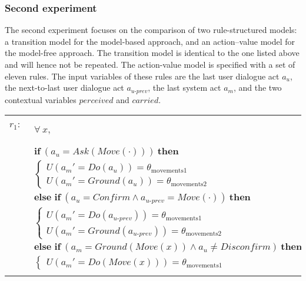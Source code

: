 \subsubsection*{Second experiment}

The second experiment focuses on the comparison of two rule-structured models: a transition model for the model-based approach, and an action--value model for the model-free approach. The transition model is identical to the one listed above and will hence not be repeated.  The action-value model is specified with a set of eleven rules.  The input variables of these rules are the last user dialogue act $a_u$, the next-to-last user dialogue act $a_{u\mbox{-}prev}$, the last system act $a_m$, and the two contextual variables $\mathit{perceived}$ and $\mathit{carried}$. 

\begin{footnotesize}
\begin{longtable}{p{1cm}p{14cm}}
$r_{1}$: \ \ & $\forall \ x, $ \\ & $ \textbf{if} \ (\mathit{a_u}\!=\!\mathit{Ask(Move(\cdot))}) \ \textbf{then} $ \\
 & \;\;\;\;\; $ \begin{cases}U(\mathit{a_m}'\!=\!\mathit{Do({a_u})})\!=\!\theta_{\mathrm{movements1}} \\
U(\mathit{a_m}'\!=\!\mathit{Ground({a_u})})\!=\!\theta_{\mathrm{movements2}} \end{cases}$ \vspace{1mm} \\ & $ \textbf{else if} \ (\mathit{a_u}\!=\!\mathit{Confirm} \land \mathit{a_{u\mbox{-}prev}}\!=\!\mathit{Move(\cdot)}) \ \textbf{then}$ \\
& \;\;\;\;\; $ \begin{cases}U(\mathit{a_m}'\!=\!\mathit{Do({a_{u\mbox{-}prev}})})\!=\!\theta_{\mathrm{movements1}} \\
U(\mathit{a_m}'\!=\!\mathit{Ground({a_{u\mbox{-}prev}})})\!=\!\theta_{\mathrm{movements2}} \end{cases}$ \vspace{1mm} \\ & $ \textbf{else if} \ (\mathit{a_m}\!=\!\mathit{Ground(Move({x}))} \land \mathit{a_u}\!\neq\!\mathit{Disconfirm}) \ \textbf{then}$ \\
& \;\;\;\;\; $ \begin{cases}U(\mathit{a_m}'\!=\!\mathit{Do(Move({x}))})\!=\!\theta_{\mathrm{movements1}} \end{cases}$ \\ \\[-1mm]

\end{longtable}
\end{footnotesize}
